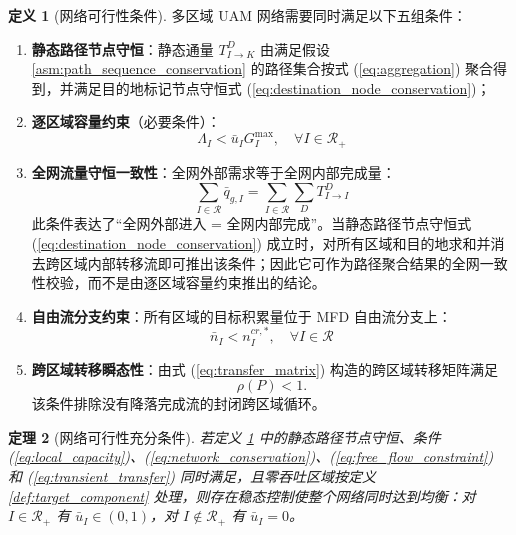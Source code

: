 \documentclass[a4paper,12pt]{article}
\theoremstyle{plain}
\newtheorem{theorem}{定理}[section]
\theoremstyle{definition}
\newtheorem{definition}[theorem]{定义}
\theoremstyle{remark}
\begin{document}
\begin{definition}[网络可行性条件]\label{def:network_feasibility}
多区域 UAM 网络需要同时满足以下五组条件：
\begin{enumerate}
    \item \textbf{静态路径节点守恒}：静态通量 $T_{I\to K}^D$ 由满足假设 \ref{asm:path_sequence_conservation} 的路径集合按式 (\ref{eq:aggregation}) 聚合得到，并满足目的地标记节点守恒式 (\ref{eq:destination_node_conservation})；
    \item \textbf{逐区域容量约束}（必要条件）：
    \begin{equation}\label{eq:local_capacity}
        \Lambda_I < \bar u_I G_I^{\max}, \quad \forall I \in \mathcal{R}_+
    \end{equation}
    \item \textbf{全网流量守恒一致性}：全网外部需求等于全网内部完成量：
    \begin{equation}\label{eq:network_conservation}
        \sum_{I \in \mathcal{R}} \bar{q}_{g,I} = \sum_{I \in \mathcal{R}} \sum_D T_{I \to I}^D
    \end{equation}
    此条件表达了“全网外部进入 = 全网内部完成”。当静态路径节点守恒式 (\ref{eq:destination_node_conservation}) 成立时，对所有区域和目的地求和并消去跨区域内部转移流即可推出该条件；因此它可作为路径聚合结果的全网一致性校验，而不是由逐区域容量约束推出的结论。
    \item \textbf{自由流分支约束}：所有区域的目标积累量位于 MFD 自由流分支上：
    \begin{equation}\label{eq:free_flow_constraint}
        \bar{n}_I < n_I^{cr,*}, \quad \forall I \in \mathcal{R}
    \end{equation}
    \item \textbf{跨区域转移瞬态性}：由式 (\ref{eq:transfer_matrix}) 构造的跨区域转移矩阵满足
    \begin{equation}\label{eq:transient_transfer}
        \rho(P)<1 .
    \end{equation}
    该条件排除没有降落完成流的封闭跨区域循环。
\end{enumerate}
\end{definition}

\begin{theorem}[网络可行性充分条件]\label{thm:network_feasibility}
若定义 \ref{def:network_feasibility} 中的静态路径节点守恒、条件 (\ref{eq:local_capacity})、(\ref{eq:network_conservation})、(\ref{eq:free_flow_constraint}) 和 (\ref{eq:transient_transfer}) 同时满足，且零吞吐区域按定义 \ref{def:target_component} 处理，则存在稳态控制使整个网络同时达到均衡：对 $I\in\mathcal R_+$ 有 $\bar{u}_I \in (0,1)$，对 $I\notin\mathcal R_+$ 有 $\bar u_I=0$。
\end{theorem}
\end{document}
